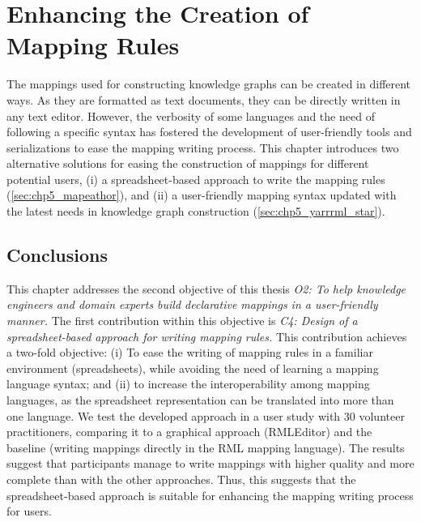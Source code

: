 
\chapter{Enhancing the Creation of Mapping Rules}
\label{chapter:creation}

The mappings used for constructing knowledge graphs can be created in different ways. As they are formatted as text documents, they can be directly written in any text editor. However, the verbosity of some languages and the need of following a specific syntax has fostered the development of user-friendly tools and serializations to ease the mapping writing process. This chapter introduces two alternative solutions for easing the construction of mappings for different potential users, (i) a spreadsheet-based approach to write the mapping rules (\cref{sec:chp5_mapeathor}), and (ii) a user-friendly mapping syntax updated with the latest needs in knowledge graph construction (\cref{sec:chp5_yarrrml_star}).





\section{Conclusions}

This chapter addresses the second objective of this thesis \textit{O2: To help knowledge engineers and domain experts build declarative mappings in a user-friendly manner.}
The first contribution within this objective is \textit{C4: Design of a spreadsheet-based approach for writing mapping rules.} This contribution achieves a two-fold objective: (i) To ease the writing of mapping rules in a familiar environment (spreadsheets), while avoiding the need of learning a mapping language syntax; and (ii) to increase the interoperability among mapping languages, as the spreadsheet representation can be translated into more than one language. We test the developed approach in a user study with 30 volunteer practitioners, comparing it to a graphical approach (RMLEditor) and the baseline (writing mappings directly in the RML mapping language). The results suggest that participants manage to write mappings with higher quality and more complete than with the other approaches. Thus, this suggests that the spreadsheet-based approach is suitable for enhancing the mapping writing process for users. 

